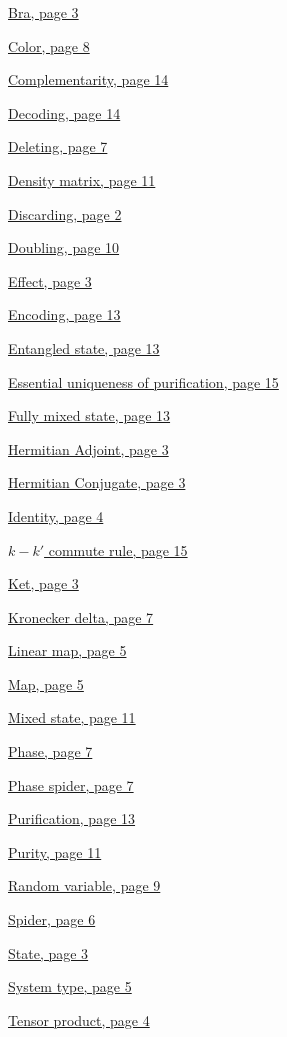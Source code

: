 \documentclass[]{article}
\begin{document}
\hyperref[braandket]{Bra, page 3}

\hyperref[coloursandbases]{Color, page 8}

\hyperref[complementarity]{Complementarity, page 14}

\hyperref[encodingdecoding]{Decoding, page 14}

\hyperref[spiders]{Deleting, page 7}

\hyperref[doubling]{Density matrix, page 11}

\hyperref[discarding]{Discarding, page 2}

\hyperref[doubling]{Doubling, page 10}

\hyperref[braandket]{Effect, page 3}

\hyperref[encodingdecoding]{Encoding, page 13}

\hyperref[entanglement]{Entangled state, page 13}

\hyperref[section:essentialuniqueness]{Essential uniqueness of purification, page 15}

\hyperref[discarding]{Fully mixed state, page 13}

\hyperref[braandket]{Hermitian Adjoint, page 3}

\hyperref[braandket]{Hermitian Conjugate, page 3}

\hyperref[identity]{Identity, page 4}

\hyperref[section:kkcommute]{$k-k'$ commute rule, page 15}

\hyperref[braandket]{Ket, page 3}

\hyperref[spiders]{Kronecker delta, page 7}

\hyperref[maps]{Linear map, page 5}

\hyperref[maps]{Map, page 5}

\hyperref[doubling]{Mixed state, page 11}

\hyperref[phasespiders]{Phase, page 7}

\hyperref[phasespiders]{Phase spider, page 7}

\hyperref[discarding]{Purification, page 13}

\hyperref[doubling]{Purity, page 11}

\hyperref[spiders]{Random variable, page 9}

\hyperref[spiders]{Spider, page 6}

\hyperref[braandket]{State, page 3}

\hyperref[identity]{System type, page 5}

\hyperref[section:tensorproduct]{Tensor product, page 4}
\end{document}
